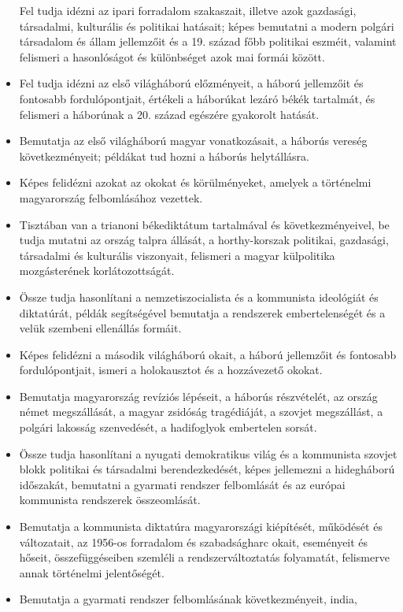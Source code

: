 \begin{itemize}
  Fel tudja idézni az ipari forradalom szakaszait, illetve azok
  gazdasági, társadalmi, kulturális és politikai hatásait; képes
  bemutatni a modern polgári társadalom és állam jellemzőit és a 19.
  század főbb politikai eszméit, valamint felismeri a hasonlóságot és
  különbséget azok mai formái között.
\item
  Fel tudja idézni az első világháború előzményeit, a háború jellemzőit
  és fontosabb fordulópontjait, értékeli a háborúkat lezáró békék
  tartalmát, és felismeri a háborúnak a 20. század egészére gyakorolt
  hatását.
\item
  Bemutatja az első világháború magyar vonatkozásait, a háborús vereség
  következményeit; példákat tud hozni a háborús helytállásra.
\item
  Képes felidézni azokat az okokat és körülményeket, amelyek a
  történelmi magyarország felbomlásához vezettek.
\item
  Tisztában van a trianoni békediktátum tartalmával és
  következményeivel, be tudja mutatni az ország talpra állását, a
  horthy-korszak politikai, gazdasági, társadalmi és kulturális
  viszonyait, felismeri a magyar külpolitika mozgásterének
  korlátozottságát.
\item
  Össze tudja hasonlítani a nemzetiszocialista és a kommunista
  ideológiát és diktatúrát, példák segítségével bemutatja a rendszerek
  embertelenségét és a velük szembeni ellenállás formáit.
\item
  Képes felidézni a második világháború okait, a háború jellemzőit és
  fontosabb fordulópontjait, ismeri a holokausztot és a hozzávezető
  okokat.
\item
  Bemutatja magyarország revíziós lépéseit, a háborús részvételét, az
  ország német megszállását, a magyar zsidóság tragédiáját, a szovjet
  megszállást, a polgári lakosság szenvedését, a hadifoglyok embertelen
  sorsát.
\item
  Össze tudja hasonlítani a nyugati demokratikus világ és a kommunista
  szovjet blokk politikai és társadalmi berendezkedését, képes
  jellemezni a hidegháború időszakát, bemutatni a gyarmati rendszer
  felbomlását és az európai kommunista rendszerek összeomlását.
\item
  Bemutatja a kommunista diktatúra magyarországi kiépítését, működését
  és változatait, az 1956-os forradalom és szabadságharc okait,
  eseményeit és hőseit, összefüggéseiben szemléli a rendszerváltoztatás
  folyamatát, felismerve annak történelmi jelentőségét.
\item
  Bemutatja a gyarmati rendszer felbomlásának következményeit, india,

\end{itemize}
